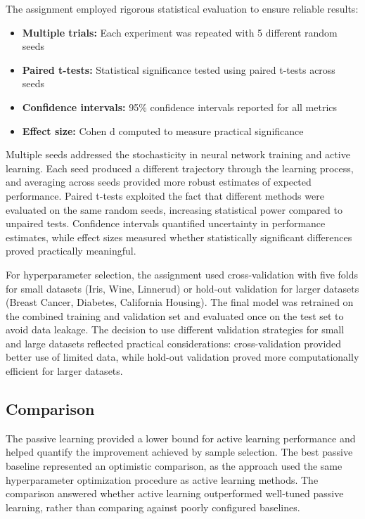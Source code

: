 \documentclass[conference]{IEEEtran}
\begin{document}
The assignment employed rigorous statistical evaluation to ensure reliable results:

\begin{itemize}
\item \textbf{Multiple trials:} Each experiment was repeated with 5 different random seeds
\item \textbf{Paired t-tests:} Statistical significance tested using paired t-tests across seeds
\item \textbf{Confidence intervals:} 95\% confidence intervals reported for all metrics
\item \textbf{Effect size:} Cohen d computed to measure practical significance
\end{itemize}

Multiple seeds addressed the stochasticity in neural network training and active learning. Each seed produced a different trajectory through the learning process, and averaging across seeds provided more robust estimates of expected performance. Paired t-tests exploited the fact that different methods were evaluated on the same random seeds, increasing statistical power compared to unpaired tests. Confidence intervals quantified uncertainty in performance estimates, while effect sizes measured whether statistically significant differences proved practically meaningful.

For hyperparameter selection, the assignment used cross-validation with five folds for small datasets (Iris, Wine, Linnerud) or hold-out validation for larger datasets (Breast Cancer, Diabetes, California Housing). The final model was retrained on the combined training and validation set and evaluated once on the test set to avoid data leakage. The decision to use different validation strategies for small and large datasets reflected practical considerations: cross-validation provided better use of limited data, while hold-out validation proved more computationally efficient for larger datasets.

\subsection{Comparison}

The passive learning provided a lower bound for active learning performance and helped quantify the improvement achieved by sample selection. The best passive baseline represented an optimistic comparison, as the approach used the same hyperparameter optimization procedure as active learning methods. The comparison answered whether active learning outperformed well-tuned passive learning, rather than comparing against poorly configured baselines.
\end{document}

